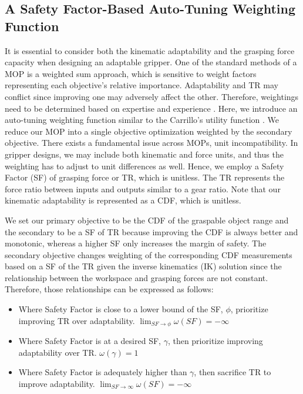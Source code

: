 \documentclass[letterpaper, 10 pt, conference]{ieeeconf}  %
\newcommand{\eq}[1]{(\ref{#1})}
\begin{document}
\subsection{A Safety Factor-Based Auto-Tuning Weighting Function \label{sec:weight}}
It is essential to consider both the kinematic adaptability and the grasping force capacity when designing an adaptable gripper. 
One of the standard methods of a MOP is a weighted sum approach, which is sensitive to weight factors representing each objective's relative importance.
Adaptability and TR may conflict since improving one may adversely affect the other. Therefore, weightings need to be determined based on expertise and experience \cite{multiobject_design}. Here, we introduce an auto-tuning weighting function similar to the Carrillo's utility function \cite{auto-tuning}. We reduce our MOP into a single objective optimization weighted by the secondary objective. There exists a fundamental issue across MOPs, unit incompatibility. In gripper designs, we may include both kinematic and force units, and thus the weighting has to adjust to unit differences as well. Hence, we employ a Safety Factor (SF) of grasping force or TR, which is unitless. The TR represents the force ratio between inputs and outputs similar to a gear ratio. Note that our kinematic adaptability is represented as a CDF, which is unitless.%

We set our primary objective to be the CDF of the graspable object range and the secondary to be a SF of TR because improving the CDF is always better and monotonic, whereas a higher SF only increases the margin of safety.
The secondary objective changes weighting of the corresponding CDF measurements based on a SF of the TR given the inverse kinematics (IK) solution since the relationship between the workspace and grasping forces are not constant. Therefore, those relationships can be expressed as follows:%
\begin{itemize}
    \item Where Safety Factor is close to a lower bound of the SF, $\phi$, prioritize improving TR over adaptability. $\lim_{SF\to\phi} \omega(SF) = -\infty$
    \item Where Safety Factor is at a desired SF, $\gamma$, then prioritize improving adaptability over TR. $\omega(\gamma) = 1$
    \item Where Safety Factor is adequately higher than $\gamma$, then sacrifice TR to improve adaptability. $\lim_{SF\to\infty} \omega(SF) = -\infty$
\end{itemize}
\end{document}

